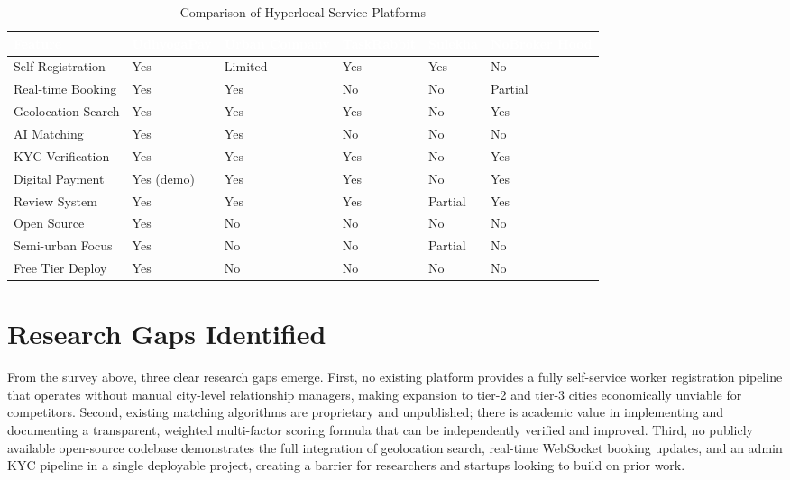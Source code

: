 \documentclass[12pt,a4paper]{report}
\newcommand{\thead}[1]{\cellcolor{tableheader}\textcolor{white}{\textbf{#1}}}
\begin{document}
\begin{table}[h!]
\centering
\caption{Comparison of Hyperlocal Service Platforms}
\label{tab:litsurvey}
\renewcommand{\arraystretch}{1.4}
\begin{tabular}{|p{3cm}|p{2cm}|p{2cm}|p{2cm}|p{2cm}|p{2cm}|}
\hline
\thead{Feature} & \thead{UdhyogaPay} & \thead{Urban Company} & \thead{TaskRabbit} & \thead{Sulekha} & \thead{NoBroker Hood} \\
\hline
Self-Registration & Yes & Limited & Yes & Yes & No \\
\hline
Real-time Booking & Yes & Yes & No & No & Partial \\
\hline
Geolocation Search & Yes & Yes & Yes & No & Yes \\
\hline
AI Matching & Yes & Yes & No & No & No \\
\hline
KYC Verification & Yes & Yes & Yes & No & Yes \\
\hline
Digital Payment & Yes (demo) & Yes & Yes & No & Yes \\
\hline
Review System & Yes & Yes & Yes & Partial & Yes \\
\hline
Open Source & Yes & No & No & No & No \\
\hline
Semi-urban Focus & Yes & No & No & Partial & No \\
\hline
Free Tier Deploy & Yes & No & No & No & No \\
\hline
\end{tabular}
\end{table}

\section{Research Gaps Identified}

From the survey above, three clear research gaps emerge. First, no existing platform provides a fully self-service worker registration pipeline that operates without manual city-level relationship managers, making expansion to tier-2 and tier-3 cities economically unviable for competitors. Second, existing matching algorithms are proprietary and unpublished; there is academic value in implementing and documenting a transparent, weighted multi-factor scoring formula that can be independently verified and improved. Third, no publicly available open-source codebase demonstrates the full integration of geolocation search, real-time WebSocket booking updates, and an admin KYC pipeline in a single deployable project, creating a barrier for researchers and startups looking to build on prior work.
\end{document}
